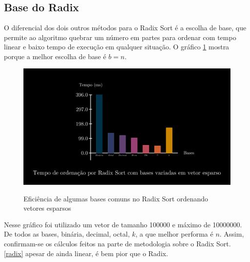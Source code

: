 \documentclass[fontsize=11pt]{article}
\begin{document}
    \subsection{Base do Radix}
      O diferencial dos dois outros métodos para o Radix Sort é a escolha de base, que permite ao 
      algoritmo quebrar um número em partes para ordenar com tempo linear e baixo tempo de 
      execução em qualquer situação. O gráfico \ref{fig:radixBase} mostra porque a melhor escolha de base é
      $b=n$.
      \begin{figure}[H]
        \caption{Eficiência de algumas bases comuns no Radix Sort ordenando vetores esparsos}
        \includegraphics[width=\textwidth]{bargraph.png}
        \label{fig:radixBase}
      \end{figure}
      Nesse gráfico foi utilizado um vetor de tamanho 100000 e máximo de 10000000. 
      De todos as bases, binária, decimal, octal, $k$, a que melhor performa é $n$.
      Assim, confirmam-se os cálculos feitos na parte de metodologia sobre o Radix Sort. \ref{radix}
      apesar de ainda linear, é bem pior que o Radix. 
\end{document}
